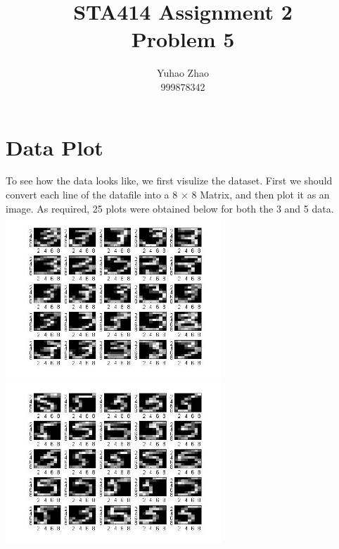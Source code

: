 \documentclass[12pt]{article}
\begin{document}
 
 
\title{STA414 Assignment 2\\ Problem 5  }%
\author{Yuhao Zhao\\ %
999878342} %
 
\maketitle
 
\section{Data Plot}

To see how the data looks like, we first visulize the dataset. First we should convert each line of the datafile into a 8 $ \times $ 8 Matrix, and then plot it as an image. As required, 25 plots were obtained below for both the 3 and 5 data.\\

\includegraphics[width=3.2in]{3} 
\includegraphics[width=3.2in]{5}\\
\end{document}
